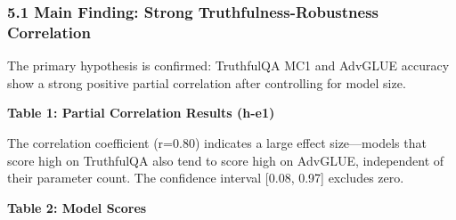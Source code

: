 
\subsubsection{5.1 Main Finding: Strong Truthfulness-Robustness Correlation}

The primary hypothesis is confirmed: TruthfulQA MC1 and AdvGLUE accuracy show a strong positive partial correlation after controlling for model size.

\textbf{Table 1: Partial Correlation Results (h-e1)}

\begin{table}[htbp]
\centering
{}
\end{table}

The correlation coefficient (r=0.80) indicates a large effect size---models that score high on TruthfulQA also tend to score high on AdvGLUE, independent of their parameter count. The confidence interval [0.08, 0.97] excludes zero.

\textbf{Table 2: Model Scores}

